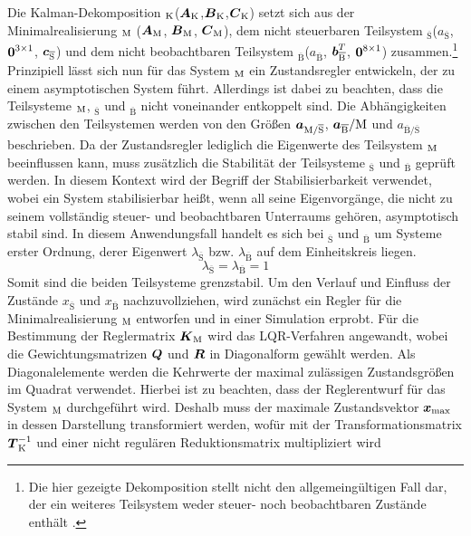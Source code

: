 Die Kalman-Dekomposition $_{\text{K}}$($\boldsymbol{A}_{\text{K}}$,$\boldsymbol{B}_{\text{K}}$,$\boldsymbol{C}_{\text{K}}$) setzt sich aus der Minimalrealisierung $_{\text{M}}$ ($\boldsymbol{A}_{\text{M}}$, $\boldsymbol{B}_{\text{M}}$, $\boldsymbol{C}_{\text{M}}$), dem nicht steuerbaren Teilsystem $_{\overline{\text{S}}}$($a_{\overline{\text{S}}}$, $\boldsymbol{0}^{3\times 1}$, $\boldsymbol{c}_{\overline{\text{S}}}$) und dem nicht beobachtbaren Teilsystem $_{\overline{\text{B}}}$($a_{\overline{\text{B}}}$, $\boldsymbol{b}^T_{\overline{\text{B}}}$, $\boldsymbol{0}^{8\times 1}$) zusammen.\footnote{Die hier gezeigte Dekomposition stellt nicht den allgemeingültigen Fall dar, der ein weiteres Teilsystem weder steuer- noch beobachtbaren Zustände enthält \cite[S. 108 ff.]{LunzeRT2}.} Prinzipiell lässt sich nun für das System $_{\text{M}}$ ein Zustandsregler entwickeln, der zu einem asymptotischen System führt. Allerdings ist dabei zu beachten, dass die Teilsysteme $_{\text{M}}$, $_{\overline{\text{S}}}$ und $_{\overline{\text{B}}}$ nicht voneinander entkoppelt sind. Die Abhängigkeiten zwischen den Teilsystemen werden von den Größen $\boldsymbol{a}_{\text{M}/\overline{\text{S}}}$, $\boldsymbol{a}_{\overline{\text{B}}}/\text{M}$ und $a_{\overline{\text{B}}/\overline{\text{S}}}$ beschrieben. Da der Zustandsregler lediglich die Eigenwerte des Teilsystem $_{\text{M}}$ beeinflussen kann, muss zusätzlich die Stabilität der Teilsysteme $_{\overline{\text{S}}}$ und $_{\overline{\text{B}}}$ geprüft werden. In diesem Kontext wird der Begriff der Stabilisierbarkeit verwendet, wobei ein System stabilisierbar heißt, wenn all seine Eigenvorgänge, die nicht zu seinem vollständig steuer- und beobachtbaren Unterraums gehören, asymptotisch stabil sind. In diesem Anwendungsfall handelt es sich bei $_{\overline{\text{S}}}$ und $_{\overline{\text{B}}}$ um Systeme erster Ordnung, derer Eigenwert $\lambda_{\overline{\text{S}}}$ bzw. $\lambda_{\overline{\text{B}}}$ auf dem Einheitskreis liegen.
\begin{equation}
\lambda_{\overline{\text{S}}} = \lambda_{\overline{\text{B}}} = 1
\end{equation}
Somit sind die beiden Teilsysteme grenzstabil. Um den Verlauf und Einfluss der Zustände $x_{\overline{\text{S}}}$ und $x_{\overline{\text{B}}}$ nachzuvollziehen, wird zunächst ein Regler für die Minimalrealisierung $_{\text{M}}$ entworfen und in einer Simulation erprobt. Für die Bestimmung der Reglermatrix $\boldsymbol{K}_{\text{M}}$ wird das LQR-Verfahren angewandt, wobei die Gewichtungsmatrizen $\boldsymbol{Q}$ und $\boldsymbol{R}$ in Diagonalform gewählt werden. Als Diagonalelemente werden die Kehrwerte der maximal zulässigen Zustandsgrößen im Quadrat verwendet. Hierbei ist zu beachten, dass der Reglerentwurf für das System $_{\text{M}}$ durchgeführt wird. Deshalb muss der maximale Zustandsvektor $\boldsymbol{x}_{\text{max}}$ in dessen Darstellung transformiert werden, wofür mit der Transformationsmatrix $\boldsymbol{T}^{-1}_{\text{K}}$ und einer nicht regulären Reduktionsmatrix multipliziert wird
